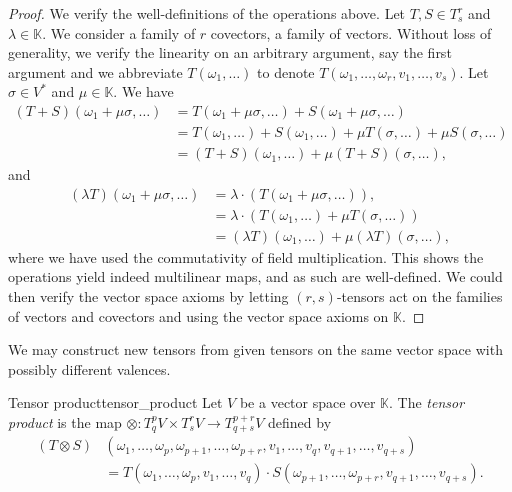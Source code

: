 \begin{proof}
    We verify the well-definitions of the operations above. Let \(T, S \in T_s^r\) and \(\lambda \in \mathbb{K}\). We consider a family  of \(r\) covectors, a family of  vectors. Without loss of generality, we verify the linearity on an arbitrary argument, say the first argument and we abbreviate \(T(\omega_1, \dots)\) to denote \(T(\omega_1, \dots, \omega_r, v_1, \dots, v_s)\). Let \(\sigma \in V ^{\ast}\) and \(\mu \in \mathbb{K}\). We have
    \begin{align*}
        (T+S)(\omega_1+\mu \sigma, \dots) &= T(\omega_1 + \mu \sigma, \dots) + S(\omega_1 + \mu \sigma, \dots)\\
                                          &= T(\omega_1, \dots) + S(\omega_1, \dots) + \mu T(\sigma, \dots) + \mu S(\sigma, \dots)\\
                                          &= (T+S)(\omega_1, \dots) + \mu (T+S)(\sigma, \dots),
    \end{align*}
    and
    \begin{align*}
        (\lambda T)(\omega_1 + \mu\sigma, \dots) &= \lambda \cdot \left(T(\omega_1 + \mu \sigma, \dots)\right),\\
                                                 &= \lambda \cdot \left(T(\omega_1, \dots) + \mu T(\sigma, \dots)\right)\\
                                                 &= (\lambda T)(\omega_1, \dots) + \mu (\lambda T)(\sigma, \dots),
    \end{align*}
    where we have used the commutativity of field multiplication. This shows the operations yield indeed multilinear maps, and as such are well-defined. We could then verify the vector space axioms by letting \((r,s)\)-tensors act on the families of vectors and covectors and using the vector space axioms on \(\mathbb{K}\).
\end{proof}

We may construct new tensors from given tensors on the same vector space with possibly different valences.
\begin{definition}{Tensor product}{tensor_product}
    Let \(V\) be a vector space over \(\mathbb{K}\). The \emph{tensor product} is the map \(\otimes : T_q^p V \times T_s^rV \to T_{q+s}^{p+r}V\) defined by
    \begin{align*}
        (T \otimes S)&\left(\omega_1, \dots, \omega_p, \omega_{p+1}, \dots, \omega_{p+r}, v_1, \dots, v_q, v_{q+1}, \dots, v_{q+s}\right) \\
        &= T\left(\omega_1, \dots, \omega_p, v_1, \dots, v_q\right) \cdot S\left(\omega_{p+1}, \dots, \omega_{p+r}, v_{q+1}, \dots, v_{q+s}\right).
    \end{align*}
\end{definition}

